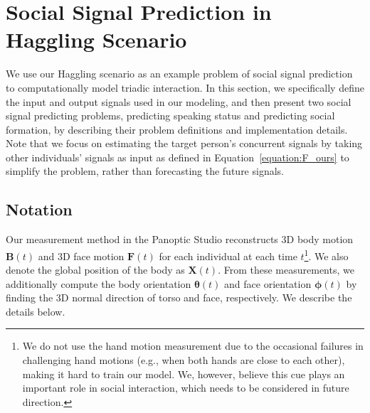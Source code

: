 
\section{Social Signal Prediction in Haggling Scenario}
We use our Haggling scenario as an example problem of social signal prediction to computationally model triadic interaction. In this section, we specifically define the input and output signals used in our modeling, and then present two social signal predicting problems, predicting speaking status and predicting social formation, by describing their problem definitions and implementation details. Note that we focus on estimating the target person's concurrent signals by taking other individuals' signals as input as defined in Equation~\ref{equation:F_ours} to simplify the problem, rather than forecasting the future signals.

\subsection{Notation}
Our measurement method in the Panoptic Studio reconstructs 3D body motion $\mathbf{B}(t)$ and 3D face motion $\mathbf{F}(t)$ for each individual at each time $t$\footnote{We do not use the hand motion measurement due to the occasional failures in challenging hand motions (e.g., when both hands are close to each other), making it hard to train our model. We, however, believe this cue plays an important role in social interaction, which needs to be considered in future direction.}. We also denote the global position of the body as $\mathbf{X}(t)$. From these measurements, we additionally compute the body orientation $\boldsymbol{\theta}(t)$ and face orientation $\boldsymbol{\phi}(t)$ by finding the 3D normal direction of torso and face, respectively. We describe the details below.

